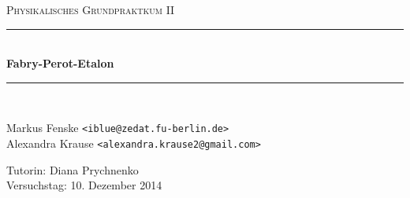 \newcommand{\HRule}{\rule{\linewidth}{0.5mm}}

\begin{center}
  \textsc{\Large Physikalisches Grundpraktkum II}
  \HRule\\[0.4 cm]
  {\huge \bfseries Fabry-Perot-Etalon}
  \HRule\\[0.4 cm]

  \begin{minipage}{0.60\textwidth}
  \begin{flushleft}
    Markus Fenske \texttt{<iblue@zedat.fu-berlin.de>} \\
    Alexandra Krause \texttt{<alexandra.krause2@gmail.com>}
  \end{flushleft}
  \end{minipage}
  \hfill
  \begin{minipage}{0.35\textwidth}
  \begin{flushright}
    Tutorin: Diana Prychnenko \\
    Versuchstag: 10. Dezember 2014
  \end{flushright}
  \end{minipage}

  \vspace{1cm}

  \tableofcontents


  \vfill
\end{center}
\newpage
